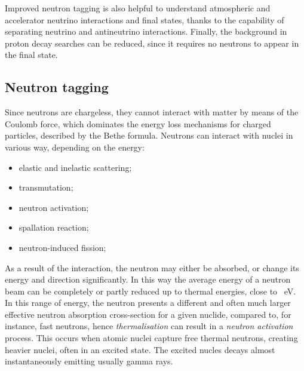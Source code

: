 Improved neutron tagging is also helpful to understand atmospheric and accelerator neutrino interactions and final states, %
thanks to the capability of separating neutrino and antineutrino interactions.
Finally, the background in proton decay searches can be reduced, since it requires no neutrons to appear in the final state.


\subsection{Neutron tagging}

Since neutrons are chargeless, they cannot interact with matter by means of the Coulomb force, %
which dominates the energy loss mechanisms for charged particles, described by the Bethe formula.
Neutrons can interact with nuclei in various way, depending on the energy:
\begin{itemize}
	\item elastic and inelastic scattering;
	\item transmutation;
	\item neutron activation;
	\item spallation reaction;
	\item neutron-induced fission;
\end{itemize}

As a result of the interaction, the neutron may either be absorbed, or change its energy and direction significantly.
In this way the average energy of a neutron beam can be completely or partly reduced up to thermal energies, %
close to ~eV.
In this range of energy, the neutron presents a different and often much larger effective neutron absorption %
cross-section for a given nuclide, compared to, for instance, fast neutrons, hence \emph{thermalisation} can %
result in a \emph{neutron activation} process.
This occurs when atomic nuclei capture free thermal neutrons, creating heavier nuclei, often in an excited state.
The excited nucles decays almost instantaneously emitting usually gamma rays.

